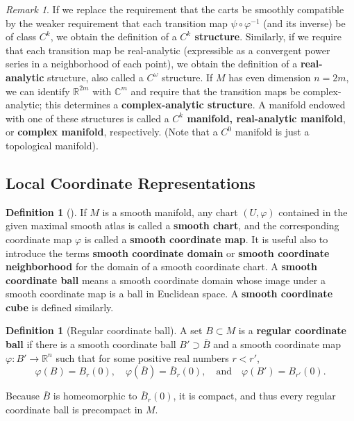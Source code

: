 \documentclass[reqno]{amsart}
\theoremstyle{plain}%
\theoremstyle{definition}
\newtheorem{definition}[theorem]{Definition}
\theoremstyle{remark}
\newtheorem*{remark}{Remark}
\begin{document}
            \begin{remark}
            If we replace the requirement that the carts be smoothly compatible by
            the weaker requirement that each transition map
            $\psi \circ \varphi^{-1}$ (and its inverse) be of class
            $C^{k}$, we obtain the definition of a \textbf{$C^{k}$ structure}.
            Similarly, if we require that each transition map be real-analytic
            (expressible as a convergent power series in a neighborhood of each point),
            we obtain the definition of a \textbf{real-analytic} structure, also called
            a $C^{\omega }$ structure. If $M$ has even dimension $n=2m$, we can
            identify $\mathbb{R}^{2m}$ with $\mathbb{C}^{m}$ and require that the
            transition maps be complex-analytic; this determines a 
            \textbf{complex-analytic structure}. A manifold endowed with one of these
            structures is called a \textbf{$C^{k}$ manifold, real-analytic manifold},
            or \textbf{complex manifold}, respectively. (Note that a
            $C^{0}$ manifold is just a topological manifold).
            \end{remark}


    \subsection*{Local Coordinate Representations}
        \begin{definition}[]
        If $M$ is a smooth manifold, any chart $\left( U, \varphi \right)
        $ contained in the given maximal smooth atlas is called a \textbf{smooth
        chart}, and the corresponding coordinate map $\varphi$ is called
        a \textbf{smooth coordinate map}. It is useful also to introduce the terms
        \textbf{smooth coordinate domain} or \textbf{smooth coordinate
        neighborhood} for the domain of a smooth coordinate chart. 
        A \textbf{smooth coordinate ball} means a smooth coordinate domain whose
        image under a smooth coordinate map is a ball in Euclidean space. 
        A \textbf{smooth coordinate cube} is defined similarly.
        \end{definition}

        \begin{definition}[Regular coordinate ball]
        A set $B \subset M$ is a \textbf{regular coordinate ball} if there is
        a smooth coordinate ball $B' \supset \overline{B}$ and a smooth coordinate
        map $\varphi  \colon B' \to \mathbb{R}^{n}$ such that for some positive
        real numbers $r < r'$,
        \[
        \varphi (B) = B_r (0), \quad \varphi \left( \overline{B} \right) 
        = \overline{B}_r (0), \quad \text{and} \quad
        \varphi \left( B' \right) = B_{r'}(0).
        \] 
        \end{definition}
        Because $\overline{B}$ is homeomorphic to $\overline{B}_r (0)$, it is compact,
        and thus every regular coordinate ball is precompact in $M$.
\end{document}
